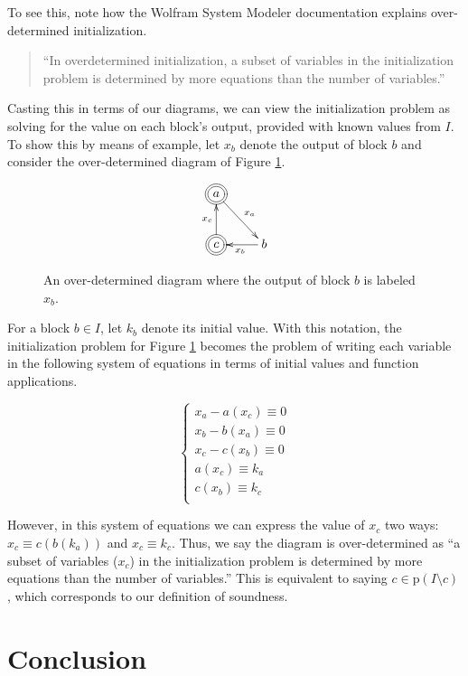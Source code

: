 \documentclass[twocolumn]{article}
\begin{document}
To see this, note how the Wolfram System Modeler documentation explains over-determined initialization.

\begin{quote}
    ``In overdetermined initialization, a subset of variables in the initialization problem is determined by more equations than the number of variables.'' \cite{WolframInitialization}
\end{quote}

Casting this in terms of our diagrams, we can view the initialization problem as solving for the value on each block's output, provided with known values from $I$. To show this by means of example, let $x_b$ denote the output of block $b$ and consider the over-determined diagram of Figure \ref{fig:wolfram-equivalence}.

\begin{figure}[h]
\[
\xymatrix {
*++[o][F=]{a} \ar[rd]^{x_a} \\
*++[o][F=]{c} \ar[u]^{x_c} & b\ar[l]^{x_b}
}
\]
    \caption{An over-determined diagram where the output of block $b$ is labeled $x_b$.}
    \label{fig:wolfram-equivalence}
\end{figure}

For a block $b\in I$, let $k_b$ denote its initial value. With this notation, the initialization problem for Figure \ref{fig:wolfram-equivalence} becomes the problem of writing each variable in the following system of equations in terms of initial values and function applications.

\[
\begin{cases}
    x_a - a(x_c) \equiv 0 \\
    x_b - b(x_a) \equiv 0 \\
    x_c - c(x_b) \equiv 0 \\
    a(x_c) \equiv k_a \\
    c(x_b) \equiv k_c \\
\end{cases}
\]

However, in this system of equations we can express the value of $x_c$ two ways: $x_c\equiv c(b(k_a))$ and $x_c\equiv k_c$. Thus, we say the diagram is over-determined as ``a subset of variables ($x_c$) in the initialization problem is determined by more equations than the number of variables.'' This is equivalent to saying $c\in \text{p}(I\setminus c)$, which corresponds to our definition of soundness.

\section{Conclusion}\label{sec:conclusion}
\end{document}

